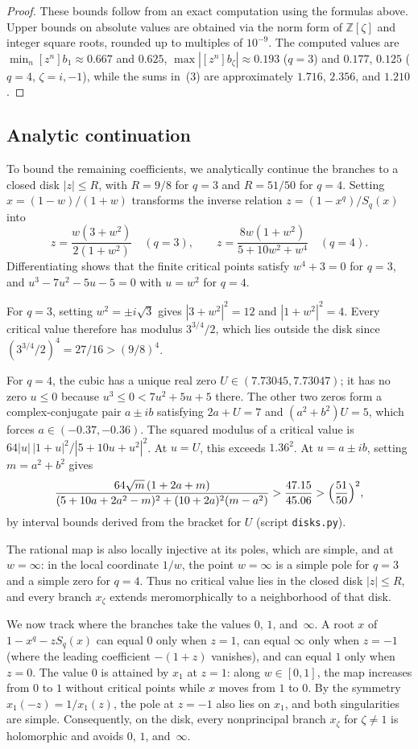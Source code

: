 \documentclass[11pt]{amsart}
\theoremstyle{remark}
\newcommand{\Z}{\mathbb{Z}}
\begin{document}
\begin{proof}
These bounds follow from an exact computation using the formulas above. Upper
bounds on absolute values are obtained via the norm form of $\Z[\zeta]$ and
integer square roots, rounded up to multiples of $10^{-9}$. The computed
values are $\min_n[z^n]b_1\approx0.667$ and $0.625$,
$\max|[z^n]b_\zeta|\approx0.193$ ($q=3$) and $0.177$, $0.125$ ($q=4$,
$\zeta=i,-1$), while the sums in~(3) are approximately $1.716$, $2.356$, and
$1.210$.
\end{proof}

\subsection{Analytic continuation}
To bound the remaining coefficients, we analytically continue the branches to
a closed disk $|z|\le R$, with $R=9/8$ for $q=3$ and $R=51/50$ for $q=4$.
Setting $x=(1-w)/(1+w)$ transforms the inverse relation $z=(1-x^q)/S_q(x)$
into
\[
 z=\frac{w(3+w^2)}{2(1+w^2)}\quad(q=3),\qquad
 z=\frac{8w(1+w^2)}{5+10w^2+w^4}\quad(q=4).
\]
Differentiating shows that the finite critical points satisfy $w^4+3=0$ for
$q=3$, and $u^3-7u^2-5u-5=0$ with $u=w^2$ for $q=4$.

For $q=3$, setting $w^2=\pm i\sqrt3$ gives $|3+w^2|^2=12$ and $|1+w^2|^2=4$.
Every critical value therefore has modulus $3^{3/4}/2$, which lies outside the
disk since $(3^{3/4}/2)^4=27/16>(9/8)^4$.

For $q=4$, the cubic has a unique real zero $U\in(7.73045,7.73047)$; it has no
zero $u\le0$ because $u^3\le0<7u^2+5u+5$ there. The other two zeros form a
complex-conjugate pair $a\pm ib$ satisfying $2a+U=7$ and $(a^2+b^2)U=5$, which
forces $a\in(-0.37,-0.36)$. The squared modulus of a critical value is
$64|u|\,|1+u|^2/|5+10u+u^2|^2$. At $u=U$, this exceeds $1.36^2$. At
$u=a\pm ib$, setting $m=a^2+b^2$ gives
\[
 \frac{64\sqrt m\,(1+2a+m)}{(5+10a+2a^2-m)^2+(10+2a)^2(m-a^2)}>\frac{47.15}{45.06}>\Bigl(\frac{51}{50}\Bigr)^2,
\]
by interval bounds derived from the bracket for $U$ (script \texttt{disks.py}).

The rational map is also locally injective at its poles, which are simple, and
at $w=\infty$: in the local coordinate $1/w$, the point $w=\infty$ is a simple
pole for $q=3$ and a simple zero for $q=4$. Thus no critical value lies in the
closed disk $|z|\le R$, and every branch $x_\zeta$ extends meromorphically to
a neighborhood of that disk.

We now track where the branches take the values $0$, $1$, and~$\infty$. A root
$x$ of $1-x^q-zS_q(x)$ can equal $0$ only when $z=1$, can equal $\infty$ only
when $z=-1$ (where the leading coefficient $-(1+z)$ vanishes), and can equal
$1$ only when $z=0$. The value $0$ is attained by $x_1$ at $z=1$: along
$w\in[0,1]$, the map increases from $0$ to $1$ without critical points while
$x$ moves from $1$ to $0$. By the symmetry $x_1(-z)=1/x_1(z)$, the pole at
$z=-1$ also lies on $x_1$, and both singularities are simple. Consequently, on
the disk, every nonprincipal branch $x_\zeta$ for $\zeta\ne1$ is holomorphic
and avoids $0$, $1$, and~$\infty$.
\end{document}
